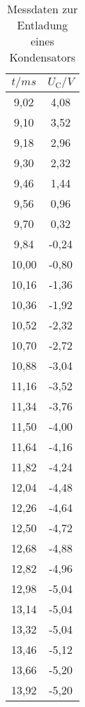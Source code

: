 \begin{table}[htbp]
	\centering
	\caption{Messdaten zur Entladung eines Kondensators}
	\label{tab:EntladungKondensator}
	\begin{tabular}{c c}
		\toprule
		$t / \si{ms} $ & $ U_\text{C} / \si{V}$ \\
		\midrule
		9,02	& 4,08 \\
		9,10	& 3,52 \\
		9,18	& 2,96 \\
		9,30	& 2,32 \\
		9,46	& 1,44 \\
		9,56	& 0,96 \\
		9,70	& 0,32 \\
		9,84	& -0,24 \\
		10,00 & -0,80 \\
		10,16 &-1,36 \\
		10,36 &-1,92 \\
		10,52 &-2,32 \\
		10,70 &-2,72 \\
		10,88 &-3,04 \\
		11,16 &-3,52 \\
		11,34 &-3,76 \\
		11,50 &-4,00 \\
		11,64 &-4,16 \\
		11,82 &-4,24 \\
		12,04 &-4,48 \\
		12,26 &-4,64 \\
		12,50 &-4,72 \\
		12,68 &-4,88 \\
		12,82 &-4,96 \\
		12,98 &-5,04 \\
		13,14 &-5,04 \\
		13,32 &-5,04 \\
		13,46 &-5,12 \\
		13,66 &-5,20 \\
		13,92 &-5,20 \\
		\bottomrule
	\end{tabular}
\end{table}
\FloatBarrier
